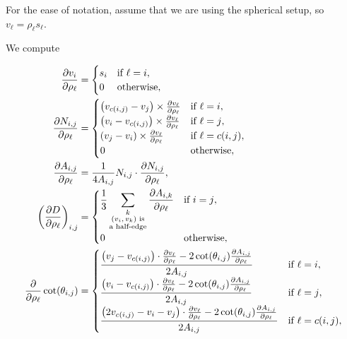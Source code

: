 For the ease of notation, assume that we are using the spherical setup, so \(v_\ell = \rho_\ell s_\ell\).

We compute

\begin{align*}
	\frac{\partial v_i}{\partial \rho_\ell} &= \begin{cases}
		s_i & \text{if \(\ell = i\)}, \\
		0 & \text{otherwise},
	\end{cases} \\
	\frac{\partial N_{i, j}}{\partial \rho_\ell} &= \begin{cases}
		\pof{v_{c\pof{i, j}} - v_j} \times \frac{\partial v_\ell}{\partial \rho_\ell} & \text{if \(\ell = i\)}, \\
		\pof{v_i - v_{c\pof{i, j}}} \times \frac{\partial v_\ell}{\partial \rho_\ell} & \text{if \(\ell = j\)}, \\
		\pof{v_j - v_i} \times \frac{\partial v_\ell}{\partial \rho_\ell} & \text{if \(\ell = c\pof{i, j}\)}, \\
		0 & \text{otherwise},
	\end{cases} \\
	\frac{\partial A_{i, j}}{\partial \rho_\ell} &= \frac{1}{4A_{i, j}}N_{i, j} \cdot \frac{\partial N_{i, j}}{\partial \rho_\ell}, \\
	\pof{\frac{\partial D}{\partial \rho_\ell}}_{i, j} &= \begin{cases}
		\displaystyle\frac{1}{3}\sum_{\substack{k \\ \text{\(\pof{v_i, v_k}\) is} \\ \text{a half-edge}}}\frac{\partial A_{i, k}}{\partial \rho_\ell} & \text{if \(i = j\)}, \\
		0 & \text{otherwise},
	\end{cases} \\
	\frac{\partial}{\partial \rho_\ell}\cot\pof{\theta_{i, j}} &= \begin{cases}
		\displaystyle\frac{\pof{v_j - v_{c\pof{i, j}}} \cdot \frac{\partial v_\ell}{\partial \rho_\ell} - 2\cot\pof{\theta_{i, j}}\frac{\partial A_{i, j}}{\partial \rho_\ell}}{2A_{i, j}} & \text{if \(\ell = i\)}, \\
		\displaystyle\frac{\pof{v_i - v_{c\pof{i, j}}} \cdot \frac{\partial v_\ell}{\partial \rho_\ell} - 2\cot\pof{\theta_{i, j}}\frac{\partial A_{i, j}}{\partial \rho_\ell}}{2A_{i, j}} & \text{if \(\ell = j\)}, \\
		\displaystyle\frac{\pof{2v_{c\pof{i, j}} - v_i - v_j} \cdot \frac{\partial v_\ell}{\partial \rho_\ell} - 2\cot\pof{\theta_{i, j}}\frac{\partial A_{i, j}}{\partial \rho_\ell}}{2A_{i, j}} & \text{if \(\ell = c\pof{i, j}\)}, \\

\end{cases}
\end{align*}
